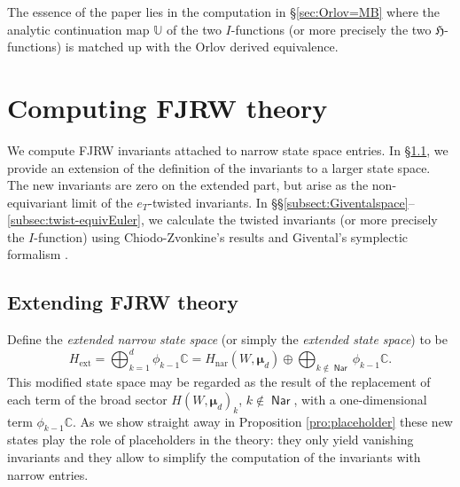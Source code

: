 \documentclass[11pt]{amsart}
\theoremstyle{definition} %
\theoremstyle{remark} %
\newcommand{\CC}{\mathbb C}
\newcommand{\UU}{\mathbb U}
\newcommand{\nar}{\operatorname{nar}}
\newcommand{\bmu}{\boldsymbol{\mu}}
\newcommand{\Nar}{\operatorname{\mathsf{Nar}}}
\newcommand{\ext}{{\operatorname{ext}}}
\newcommand{\Hf}{{\mathfrak{H}}}
\begin{document}
\bigskip 
\noindent
The essence of the paper lies in the computation in 
\S \ref{sec:Orlov=MB} 
where the analytic continuation map $\UU$ 
of the two $I$-functions (or more precisely 
the two $\Hf$-functions) is matched up with the Orlov 
derived equivalence. 


\section{Computing FJRW theory}
\label{sect:computing}
We compute FJRW invariants attached to 
narrow state space entries. 
In \S\ref{subsubsect:extending}, 
we provide an extension 
of the definition of the invariants to a larger state space. 
The new invariants are zero on 
the extended part, but arise as the non-equivariant limit 
of the $e_{T}$-twisted invariants.   
In \S\S \ref{subsect:Giventalspace}--\ref{subsec:twist-equivEuler},  
we calculate the twisted invariants (or more precisely 
the $I$-function) using Chiodo-Zvonkine's results \cite{CZ} 
and Givental's symplectic formalism \cite{Givental}. 

\subsection{Extending FJRW theory}
\label{subsubsect:extending}
Define the \emph{extended narrow state space} 
(or simply the \emph{extended state space}) 
to be 
\begin{equation} 
\label{eq:extendedstate}
H_{\ext}=\bigoplus_{k=1}^{d} 
\phi_{k-1}\CC=H_{\nar}(W,\bmu_d)\oplus 
\bigoplus_{k\not \in \Nar} \phi_{k-1}\CC.
\end{equation} 
This modified state space may be regarded as the result of the
replacement of each term of  the broad sector 
$H(W,\bmu_d)_k$, $k\not\in \Nar$, 
with a one-dimensional term $\phi_{k-1}\CC$. As we 
show straight away 
in Proposition \ref{pro:placeholder} 
these new states play the role of placeholders in the theory: they 
only yield vanishing invariants and they allow 
to simplify the computation of the invariants with narrow entries.
\end{document}
